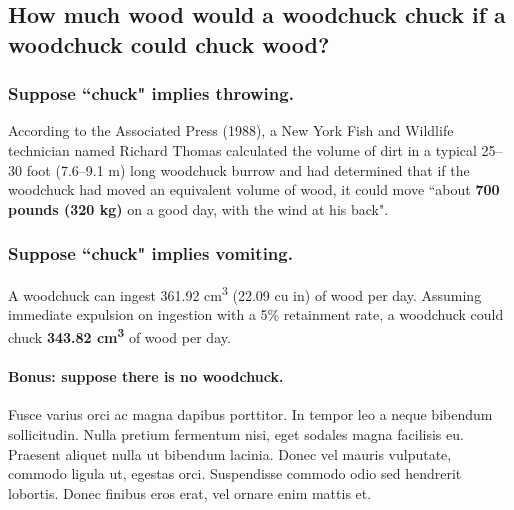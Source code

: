 \documentclass[11pt]{scrartcl} %
\begin{document}
\subsection{How much wood would a woodchuck chuck if a woodchuck could chuck wood?}


\subsubsection{Suppose ``chuck" implies throwing.}

According to the Associated Press (1988), a New York Fish and Wildlife technician named Richard Thomas calculated the volume of dirt in a typical 25--30 foot (7.6--9.1 m) long woodchuck burrow and had determined that if the woodchuck had moved an equivalent volume of wood, it could move ``about \textbf{700 pounds (320 kg)} on a good day, with the wind at his back".


\subsubsection{Suppose ``chuck" implies vomiting.}

A woodchuck can ingest 361.92 cm\textsuperscript{3} (22.09 cu in) of wood per day. Assuming immediate expulsion on ingestion with a 5\% retainment rate, a woodchuck could chuck \textbf{343.82 cm\textsuperscript{3}} of wood per day.


\paragraph{Bonus: suppose there is no woodchuck.}

Fusce varius orci ac magna dapibus porttitor. In tempor leo a neque bibendum sollicitudin. Nulla pretium fermentum nisi, eget sodales magna facilisis eu. Praesent aliquet nulla ut bibendum lacinia. Donec vel mauris vulputate, commodo ligula ut, egestas orci. Suspendisse commodo odio sed hendrerit lobortis. Donec finibus eros erat, vel ornare enim mattis et.

\end{document}
